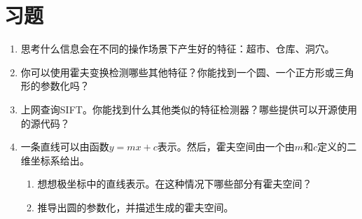 \section*{习题}\small
\begin{enumerate}

\item 思考什么信息会在不同的操作场景下产生好的特征：超市、仓库、洞穴。
\item 你可以使用霍夫变换检测哪些其他特征？你能找到一个圆、一个正方形或三角形的参数化吗？
\item 上网查询SIFT。你能找到什么其他类似的特征检测器？哪些提供可以开源使用的源代码？
\item 一条直线可以由函数$y=mx+c$表示。然后，霍夫空间由一个由$m$和$c$定义的二维坐标系给出。
\begin{enumerate}

\item 想想极坐标中的直线表示。在这种情况下哪些部分有霍夫空间？
\item 推导出圆的参数化，并描述生成的霍夫空间。
\end{enumerate}
\end{enumerate}
\normalsize

